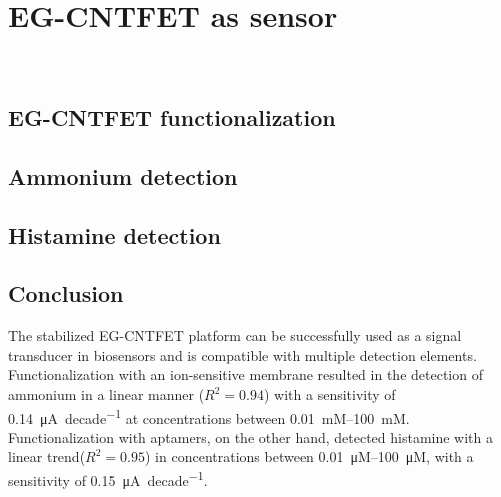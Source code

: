 \chapter{EG-CNTFET as sensor}
\label{cap:chapter4}

\newpage
\thispagestyle{empty}
\ %
\newpage


\section{EG-CNTFET functionalization}
\label{sec:EGFETfunctionalization}

%


\section{Ammonium detection}
\label{sec:ammonium}




\section{Histamine detection}
\label{sec:histamine}




\section{Conclusion}

The stabilized EG-CNTFET platform can be successfully used as a signal transducer in biosensors and is compatible with multiple detection elements. Functionalization with an ion-sensitive membrane resulted in the detection of ammonium in a linear manner ($R^2=0.94$) with a sensitivity of \SI{0.14}{\uA \per decade} at concentrations between \SIrange{0.01}{100}{mM}.
Functionalization with aptamers, on the other hand, detected histamine with a linear trend($R^2=0.95$) in concentrations between \SIrange{0.01}{100}{\micro M}, with a sensitivity of \SI{0.15}{\uA \per decade}.

\newpage
\thispagestyle{empty}
\ %
\newpage